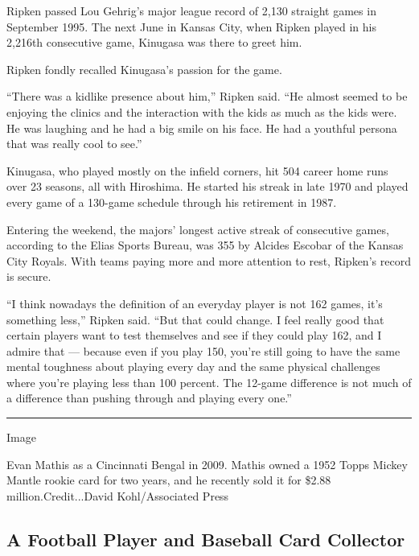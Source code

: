 Ripken passed Lou Gehrig's major league record of 2,130 straight games
in September 1995. The next June in Kansas City, when Ripken played in
his 2,216th consecutive game, Kinugasa was there to greet him.

Ripken fondly recalled Kinugasa's passion for the game.

``There was a kidlike presence about him,'' Ripken said. ``He almost
seemed to be enjoying the clinics and the interaction with the kids as
much as the kids were. He was laughing and he had a big smile on his
face. He had a youthful persona that was really cool to see.''

Kinugasa, who played mostly on the infield corners, hit 504 career home
runs over 23 seasons, all with Hiroshima. He started his streak in late
1970 and played every game of a 130-game schedule through his retirement
in 1987.

Entering the weekend, the majors' longest active streak of consecutive
games, according to the Elias Sports Bureau, was 355 by Alcides Escobar
of the Kansas City Royals. With teams paying more and more attention to
rest, Ripken's record is secure.

``I think nowadays the definition of an everyday player is not 162
games, it's something less,'' Ripken said. ``But that could change. I
feel really good that certain players want to test themselves and see if
they could play 162, and I admire that --- because even if you play 150,
you're still going to have the same mental toughness about playing every
day and the same physical challenges where you're playing less than 100
percent. The 12-game difference is not much of a difference than pushing
through and playing every one.''

\begin{center}\rule{0.5\linewidth}{\linethickness}\end{center}

Image

 Evan Mathis as a Cincinnati Bengal in 2009. Mathis owned a 1952 Topps
Mickey Mantle rookie card for two years, and he recently sold it for
\$2.88 million.Credit...David Kohl/Associated Press

\hypertarget{a-football-player-and-baseball-card-collector}{%
\subsection{A Football Player and Baseball Card
Collector}\label{a-football-player-and-baseball-card-collector}}


